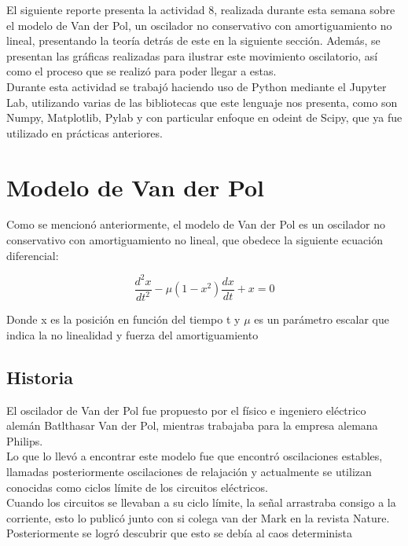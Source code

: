 \documentclass[12pt]{article}
\begin{document}
El siguiente reporte presenta la actividad 8, realizada durante esta semana sobre el modelo de Van der Pol, un oscilador no conservativo con amortiguamiento no lineal, presentando la teoría detrás de este en la siguiente sección. Además, se presentan las gráficas realizadas para ilustrar este movimiento oscilatorio, así como el proceso que se realizó para poder llegar a estas. \\

Durante esta actividad se trabajó haciendo uso de Python mediante el Jupyter Lab, utilizando varias de las bibliotecas que este lenguaje nos presenta, como son Numpy, Matplotlib, Pylab y con particular enfoque en odeint de Scipy, que ya fue utilizado en prácticas anteriores. \\

\section{Modelo de Van der Pol}

Como se mencionó anteriormente, el modelo de Van der Pol es un oscilador no conservativo con amortiguamiento no lineal, que obedece la siguiente ecuación diferencial:

\begin{equation}
\frac{d^2x}{dt^2} -\mu (1-x^2) \frac{dx}{dt}+x=0
\end{equation}

Donde x es la posición en función del tiempo t y $\mu$ es un parámetro escalar que indica la no linealidad y fuerza del amortiguamiento

\subsection{Historia}

El oscilador de Van der Pol fue propuesto por el físico e ingeniero eléctrico alemán Batlthasar Van der Pol, mientras trabajaba para la empresa alemana Philips. \\

Lo que lo llevó a encontrar este modelo fue que encontró oscilaciones estables, llamadas posteriormente oscilaciones de relajación y actualmente se utilizan conocidas como ciclos límite de los circuitos eléctricos.  \\

Cuando los circuitos se llevaban a su ciclo límite, la señal arrastraba consigo a la corriente, esto lo publicó junto con si colega van der Mark en la revista Nature. Posteriormente se logró descubrir que esto se debía al caos determinista \\
\end{document}
